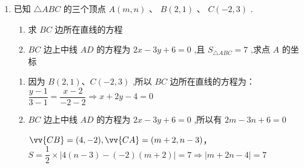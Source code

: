 \begin{enumerate}
    
    \begin{jieda}
    \end{jieda}




    \item 已知 $\bigtriangleup  {ABC}$ 的三个顶点 $A\left( {m,n}\right)$ 、 $B\left( {2,1}\right)$ 、 $C\left( {-2,3}\right)$ .
    \begin{enumerate}
        \item 求 ${BC}$ 边所在直线的方程
        \item ${BC}$ 边上中线 ${AD}$ 的方程为 ${2x} - {3y} + 6 = 0$ ,且 ${S}_{\bigtriangleup {ABC}} = 7$ ,求点 $A$ 的坐标
    \end{enumerate}
    \begin{jieda}
        \begin{enumerate}
            \item 因为 $B\left( {2,1}\right) \text{、}C\left( {-2,3}\right)$ ,所以 ${BC}$ 边所在直线的方程为：$\dfrac{y - 1}{3 - 1} = \dfrac{x - 2}{-2 - 2} \Longrightarrow  x + {2y} - 4 = 0$
            
            \item ${BC}$ 边上中线 ${AD}$ 的方程为 ${2x} - {3y} + 6 = 0$ ,所以有 ${2m} - {3n} + 6 = 0$ 

            $\vv{CB} = (4, -2), \vv{CA} = (m+2, n-3)$，$S = \dfrac{1}{2} \times |4(n-3) - (-2)(m+2)| = 7 \Longrightarrow \left| {m + {2n} - 4}\right|  = 7$
            

\end{enumerate}
\end{jieda}
\end{enumerate}
